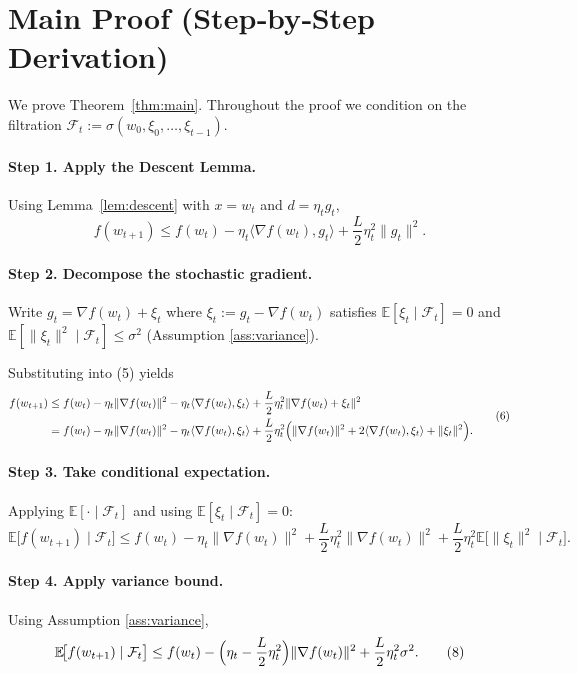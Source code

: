 \documentclass{article}
\newcommand{\EE}{\mathbb{E}}
\begin{document}
\section*{Main Proof (Step‑by‑Step Derivation)}
We prove Theorem~\ref{thm:main}. Throughout the proof we condition on the filtration
$\mathcal{F}_t:=\sigma(w_0,\xi_0,\dots,\xi_{t-1})$.

\paragraph{Step 1. Apply the Descent Lemma.}
Using Lemma~\ref{lem:descent} with $x=w_t$ and $d=\eta_t g_t$,
\[
f(w_{t+1})
\le f(w_t)-\eta_t\langle\nabla f(w_t),g_t\rangle
      +\frac{L}{2}\eta_t^{2}\|g_t\|^{2}.
\tag{5}
\]
\paragraph{Step 2. Decompose the stochastic gradient.}
Write $g_t=\nabla f(w_t)+\xi_t$ where $\xi_t:=g_t-\nabla f(w_t)$ satisfies $\EE[\xi_t\mid\mathcal{F}_t]=0$ and
$\EE[\|\xi_t\|^2\mid\mathcal{F}_t]\le\sigma^2$ (Assumption \ref{ass:variance}).

Substituting into (5) yields
\[
\begin{aligned}
f(w_{t+1})
&\le f(w_t)-\eta_t\|\nabla f(w_t)\|^{2}
      -\eta_t\langle\nabla f(w_t),\xi_t\rangle
      +\frac{L}{2}\eta_t^{2}\|\nabla f(w_t)+\xi_t\|^{2}\\
&= f(w_t)-\eta_t\|\nabla f(w_t)\|^{2}
      -\eta_t\langle\nabla f(w_t),\xi_t\rangle
      +\frac{L}{2}\eta_t^{2}\Bigl(\|\nabla f(w_t)\|^{2}
      +2\langle\nabla f(w_t),\xi_t\rangle+\|\xi_t\|^{2}\Bigr).
\end{aligned}
\tag{6}
\]
\paragraph{Step 3. Take conditional expectation.}
Applying $\EE[\cdot\mid\mathcal{F}_t]$ and using $\EE[\xi_t\mid\mathcal{F}_t]=0$:
\[
\EE\!\bigl[f(w_{t+1})\mid\mathcal{F}_t\bigr]
\le f(w_t)-\eta_t\|\nabla f(w_t)\|^{2}
     +\frac{L}{2}\eta_t^{2}\|\nabla f(w_t)\|^{2}
     +\frac{L}{2}\eta_t^{2}\EE\!\bigl[\|\xi_t\|^{2}\mid\mathcal{F}_t\bigr].
\tag{7}
\]
\paragraph{Step 4. Apply variance bound.}
Using Assumption \ref{ass:variance},
\[
\EE\!\bigl[f(w_{t+1})\mid\mathcal{F}_t\bigr]
\le f(w_t)-\Bigl(\eta_t-\frac{L}{2}\eta_t^{2}\Bigr)\|\nabla f(w_t)\|^{2}
     +\frac{L}{2}\eta_t^{2}\sigma^{2}.
\tag{8}
\]
\end{document}
